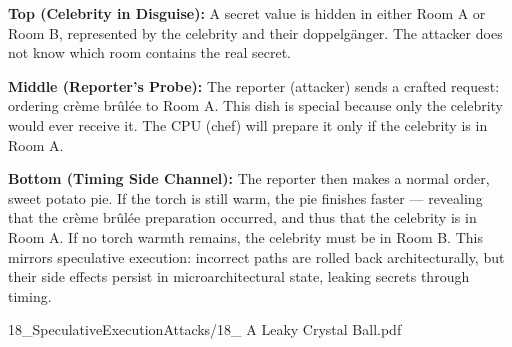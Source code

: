 \begin{SideNotePage}{
  \textbf{Top (Celebrity in Disguise):} A secret value is hidden in either Room A or Room B, represented by the celebrity and their doppelgänger. The attacker does not know which room contains the real secret. \par
  \textbf{Middle (Reporter’s Probe):} The reporter (attacker) sends a crafted request: ordering crème brûlée to Room A. This dish is special because only the celebrity would ever receive it. The CPU (chef) will prepare it only if the celebrity is in Room A. \par
  \textbf{Bottom (Timing Side Channel):} The reporter then makes a normal order, sweet potato pie. If the torch is still warm, the pie finishes faster — revealing that the crème brûlée preparation occurred, and thus that the celebrity is in Room A. If no torch warmth remains, the celebrity must be in Room B. This mirrors speculative execution: incorrect paths are rolled back architecturally, but their side effects persist in microarchitectural state, leaking secrets through timing. \par

}{18_SpeculativeExecutionAttacks/18_ A Leaky Crystal Ball.pdf}
\end{SideNotePage}
